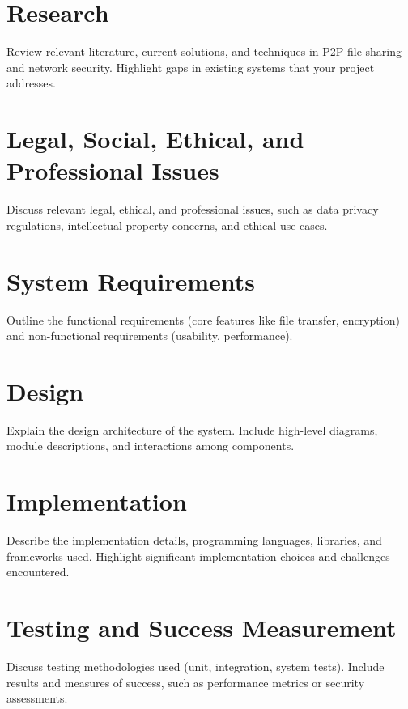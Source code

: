 \documentclass[12pt,a4paper]{report}
\begin{document}
\chapter{Research}
Review relevant literature, current solutions, and techniques in P2P file sharing and network security. Highlight gaps in existing systems that your project addresses.

\chapter{Legal, Social, Ethical, and Professional Issues}
Discuss relevant legal, ethical, and professional issues, such as data privacy regulations, intellectual property concerns, and ethical use cases.


\chapter{System Requirements}
Outline the functional requirements (core features like file transfer, encryption) and non-functional requirements (usability, performance).

\chapter{Design}
Explain the design architecture of the system. Include high-level diagrams, module descriptions, and interactions among components.

\chapter{Implementation}
Describe the implementation details, programming languages, libraries, and frameworks used. Highlight significant implementation choices and challenges encountered.

\chapter{Testing and Success Measurement}
Discuss testing methodologies used (unit, integration, system tests). Include results and measures of success, such as performance metrics or security assessments.
\end{document}
